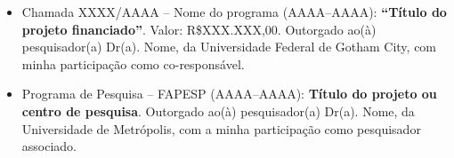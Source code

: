
\noindent \lipsum[1][1-2]
\begin{itemize}
    \item Chamada XXXX/AAAA -- Nome do programa (AAAA--AAAA): \textbf{``Título do projeto financiado''}. Valor: R\$XXX.XXX,00. Outorgado ao(à) pesquisador(a) Dr(a). Nome, da Universidade Federal de Gotham City, com minha participação como co-responsável. \lipsum[2][1-2]

    \item Programa de Pesquisa -- FAPESP (AAAA--AAAA): \textbf{Título do projeto ou centro de pesquisa}. Outorgado ao(à) pesquisador(a) Dr(a). Nome, da Universidade de Metrópolis, com a minha participação como pesquisador associado. \lipsum[3][1-2]
\end{itemize}
